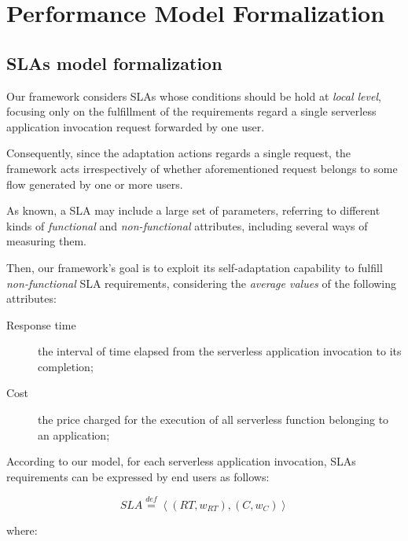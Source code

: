 \documentclass[12pt,a4paper]{report}
\newcommand{\mathDef}{\overset{\textit{def}}{=}}
\begin{document}
\newpage

\chapter{Performance Model Formalization}

\section{SLAs model formalization}

Our framework considers SLAs whose conditions should be hold at \textit{local level}, focusing only on the fulfillment of the requirements regard a single serverless application invocation request forwarded by one user.

Consequently, since the adaptation actions regards a single request, the framework acts irrespectively of whether aforementioned request belongs to some flow generated by one or more users.

As known, a SLA may include a large set of parameters, referring to different kinds of \textit{functional} and \textit{non-functional} attributes, including several ways of measuring them.

Then, our framework's goal is to exploit its self-adaptation capability to fulfill \textit{non-functional} SLA requirements, considering the \textit{average values} of the following attributes:

\begin{description}
	\item[Response time] the interval of time elapsed from the
	serverless application invocation to its completion;
	\item[Cost] the price charged for the execution of all serverless function belonging to an application;
\end{description}

According to our model, for each serverless application invocation, SLAs requirements can be expressed by end users as follows:

\begin{equation}
	SLA \mathDef \left\langle (RT,w_{RT}),(C,w_{C}) \right\rangle 
\end{equation}
   
where:
\end{document}
